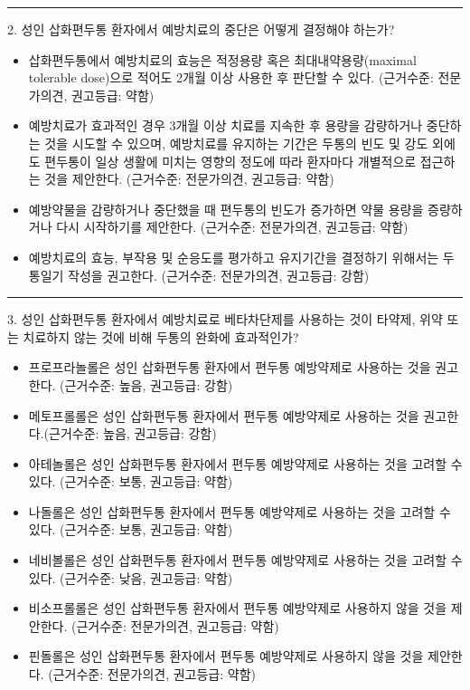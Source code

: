 \documentclass[]{book}
\begin{document}
\begin{center}\rule{0.5\linewidth}{\linethickness}\end{center}

2. 성인 삽화편두통 환자에서 예방치료의 중단은 어떻게 결정해야 하는가?

\begin{itemize}
\item
  삽화편두통에서 예방치료의 효능은 적정용량 혹은 최대내약용량(maximal tolerable dose)으로 적어도 2개월 이상 사용한 후 판단할 수 있다. (근거수준: 전문가의견, 권고등급: 약함)
\item
  예방치료가 효과적인 경우 3개월 이상 치료를 지속한 후 용량을 감량하거나 중단하는 것을 시도할 수 있으며, 예방치료를 유지하는 기간은 두통의 빈도 및 강도 외에도 편두통이 일상 생활에 미치는 영향의 정도에 따라 환자마다 개별적으로 접근하는 것을 제안한다. (근거수준: 전문가의견, 권고등급: 약함)
\item
  예방약물을 감량하거나 중단했을 때 편두통의 빈도가 증가하면 약물 용량을 증량하거나 다시 시작하기를 제안한다. (근거수준: 전문가의견, 권고등급: 약함)
\item
  예방치료의 효능, 부작용 및 순응도를 평가하고 유지기간을 결정하기 위해서는 두통일기 작성을 권고한다. (근거수준: 전문가의견, 권고등급: 강함)
\end{itemize}

\begin{center}\rule{0.5\linewidth}{\linethickness}\end{center}

3. 성인 삽화편두통 환자에서 예방치료로 베타차단제를 사용하는 것이 타약제, 위약 또는 치료하지 않는 것에 비해 두통의 완화에 효과적인가?

\begin{itemize}
\item
  프로프라놀롤은 성인 삽화편두통 환자에서 편두통 예방약제로 사용하는 것을 권고한다. (근거수준: 높음, 권고등급: 강함)
\item
  메토프롤롤은 성인 삽화편두통 환자에서 편두통 예방약제로 사용하는 것을 권고한다.(근거수준: 높음, 권고등급: 강함)
\item
  아테놀롤은 성인 삽화편두통 환자에서 편두통 예방약제로 사용하는 것을 고려할 수 있다. (근거수준: 보통, 권고등급: 약함)
\item
  나돌롤은 성인 삽화편두통 환자에서 편두통 예방약제로 사용하는 것을 고려할 수 있다. (근거수준: 보통, 권고등급: 약함)
\item
  네비볼롤은 성인 삽화편두통 환자에서 편두통 예방약제로 사용하는 것을 고려할 수 있다. (근거수준: 낮음, 권고등급: 약함)
\item
  비소프롤롤은 성인 삽화편두통 환자에서 편두통 예방약제로 사용하지 않을 것을 제안한다. (근거수준: 전문가의견, 권고등급: 약함)
\item
  핀돌롤은 성인 삽화편두통 환자에서 편두통 예방약제로 사용하지 않을 것을 제안한다. (근거수준: 전문가의견, 권고등급: 약함)
\end{itemize}
\end{document}

